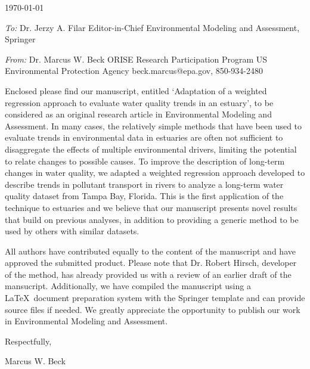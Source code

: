 \documentclass[a4paper,12pt]{article}
\begin{document}
\renewcommand{\rmdefault}{ptm}
\pagestyle{empty} 

\setlength{\parindent}{0mm} 
\setlength{\parskip}{5mm}

\begin{flushright}
\today
\end{flushright}

\emph{To:}\newline
Dr. Jerzy A. Filar\newline
Editor-in-Chief\newline
Environmental Modeling and Assessment, Springer

\emph{From:}\newline
Dr. Marcus W. Beck\newline
ORISE Research Participation Program\newline
US Environmental Protection Agency\newline
beck.marcus@epa.gov, 850-934-2480\vspace{14.5pt}

Enclosed please find our manuscript, entitled `Adaptation of a weighted regression approach to evaluate water quality trends in an estuary', to be considered as an original research article in Environmental Modeling and Assessment.  In many cases, the relatively simple methods that have been used to evaluate trends in environmental data in estuaries are often not sufficient to disaggregate the effects of multiple environmental drivers, limiting the potential to relate changes to possible causes.  To improve the description of long-term changes in water quality, we adapted a weighted regression approach developed to describe trends in pollutant transport in rivers to analyze a long-term water quality dataset from Tampa Bay, Florida. This is the first application of the technique to estuaries and we believe that our manuscript presents novel results that build on previous analyses, in addition to providing a generic method to be used  by others with similar datasets.

All authors have contributed equally to the content of the manuscript and have approved the submitted product.  Please note that Dr. Robert Hirsch, developer of the method, has already provided us with a review of an earlier draft of the mansucript.  Additionally, we have compiled the manuscript using a \LaTeX\ document preparation system with the Springer template and can provide source files if needed.  We greatly appreciate the opportunity to publish our work in Environmental Modeling and Assessment.\vspace{0.5in}

\hspace{4.5in}Respectfully,

\hspace{4.5in}Marcus W. Beck
\end{document}
